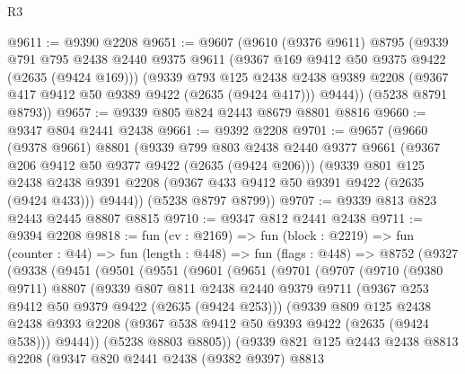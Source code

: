 \begin{lexlean}{R3}
\begin{coremodule}
@9611 := @9390 @2208
@9651 := @9607
    (@9610
      (@9376 @9611)
      @8795
      (@9339
        @791
        @795
        @2438
        @2440
        @9375
        @9611
        (@9367 @169 @9412 @50 @9375 @9422 (@2635 (@9424 @169)))
        (@9339
          @793
          @125
          @2438
          @2438
          @9389
          @2208
          (@9367 @417 @9412 @50 @9389 @9422 (@2635 (@9424 @417)))
          @9444))
      (@5238 @8791 @8793))
@9657 := @9339 @805 @824 @2443 @8679 @8801 @8816
@9660 := @9347 @804 @2441 @2438
@9661 := @9392 @2208
@9701 := @9657
    (@9660
      (@9378 @9661)
      @8801
      (@9339
        @799
        @803
        @2438
        @2440
        @9377
        @9661
        (@9367 @206 @9412 @50 @9377 @9422 (@2635 (@9424 @206)))
        (@9339
          @801
          @125
          @2438
          @2438
          @9391
          @2208
          (@9367 @433 @9412 @50 @9391 @9422 (@2635 (@9424 @433)))
          @9444))
      (@5238 @8797 @8799))
@9707 := @9339 @813 @823 @2443 @2445 @8807 @8815
@9710 := @9347 @812 @2441 @2438
@9711 := @9394 @2208
@9818 := fun (cv : @2169) =>
  fun (block : @2219) =>
  fun (counter : @44) =>
  fun (length : @448) =>
  fun (flags : @448) =>
  @8752
    (@9327
      (@9338
        (@9451
          (@9501
            (@9551
              (@9601
                (@9651
                  (@9701
                    (@9707
                      (@9710
                        (@9380 @9711)
                        @8807
                        (@9339
                          @807
                          @811
                          @2438
                          @2440
                          @9379
                          @9711
                          (@9367 @253 @9412 @50 @9379 @9422 (@2635 (@9424 @253)))
                          (@9339
                            @809
                            @125
                            @2438
                            @2438
                            @9393
                            @2208
                            (@9367 @538 @9412 @50 @9393 @9422 (@2635 (@9424 @538)))
                            @9444))
                        (@5238 @8803 @8805))
                      (@9339
                        @821
                        @125
                        @2443
                        @2438
                        @8813
                        @2208
                        (@9347
                          @820
                          @2441
                          @2438
                          (@9382 @9397)
                          @8813

\end{coremodule}
\end{lexlean}
